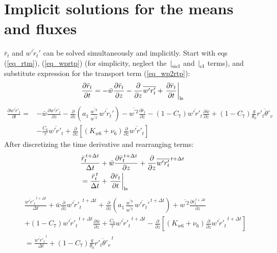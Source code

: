 \documentclass[11pt,fleqn]{article}
\newcommand{\ptlder}[2]{\frac{\partial #1}{\partial #2}}
\begin{document}
\section{Implicit solutions for the means and fluxes}

$\bar{r}_t$ and $\overline{w'r_t'}$ can be solved simultaneously and
implicitly.
Start with eqs (\ref{eq_rtm}), (\ref{eq_wprtp}) (for simplicity, neglect the 
$\left.\right|_{\rm{sicl}}$ and $\left.\right|_{\rm{cl}}$ terms), and substitute
expression for the transport term (\ref{eq_wp2rtp}):
%
\begin{equation}
\ptlder{\bar{r}_t}{t}
= - \bar{w}\ptlder{\bar{r}_t}{z} 
  - \ptlder{}{z}\overline{w'r'_t} 
  + \left. \ptlder{\bar{r}_t}{t} \right|_{\rm ls}
\end{equation}
%
\begin{equation}
\begin{split}
\ptlder{\overline{w'r'_t}}{t} 
= & - \bar{w}\ptlder{\overline{w'r'_t}}{z}	 		
    - \ptlder{}{z}
      \left(   
               a_1 \,
               \frac{\overline{w^{'3}}}{\overline{w^{'2}}} \,
               \overline{w'r_t'}
      \right)
    - \overline{w^{'2}}\ptlder{\bar{r}_t}{z} 
    - (1-C_7) \overline{w'r'_t}\ptlder{\bar{w}}{z}
    + (1-C_7) \frac{g}{\theta_0} \overline{r'_t\theta'_v} \\
  & - \frac{C_6}{\tau}\overline{w'r'_t}
    + \ptlder{}{z} \left[ \left( K_{w6} + \nu_6 \right)
                          \ptlder{}{z} \overline{w'r'_t}
                   \right]
\end{split}
\end{equation}
%
After discretizing the time derivative and rearranging terms:
%
\begin{equation}
\label{eq_rxm2}
\begin{split}
& \frac{\bar{r}_t^{\, t+\Delta t}}{\Delta t}
  + \bar{w}\ptlder{\bar{r}_t^{\, t+\Delta t}}{z} 
  + \ptlder{}{z}\overline{w'r'_t}^{\, t+\Delta t} \\
& = \frac{\bar{r}_t^{\, t}}{\Delta t}
  + \left. \ptlder{\bar{r}_t}{t} \right|_{\rm ls}
\end{split}
\end{equation}
%
\begin{equation}
\label{eq_wprxp2}
\begin{split}
& \frac{\overline{w'r'_t}^{\, t+\Delta t}}{\Delta t} 
  + \bar{w}\ptlder{}{z}\overline{w'r'_t}^{\, t+\Delta t}
  + \ptlder{}{z}
    \left(   
             a_1 \,
             \frac{\overline{w^{'3}}}{\overline{w^{'2}}} \,
             \overline{w'r_t'}^{\, t+\Delta t}
    \right)
  + \overline{w^{'2}}\ptlder{\bar{r}_t^{\, t+\Delta t}}{z} \\
& + (1-C_7) \overline{w'r'_t}^{\, t+\Delta t}\ptlder{\bar{w}}{z}
  + \frac{C_6}{\tau}\overline{w'r'_t}^{\, t+\Delta t}
  - \ptlder{}{z} \left[ \left( K_{w6} + \nu_6 \right)
                        \ptlder{}{z} \overline{w'r'_t}^{\, t+\Delta t}
                 \right]  \\
& = \frac{\overline{w'r'_t}^{\, t}}{\Delta t} 
    + (1-C_7) \frac{g}{\theta_0} \overline{r'_t\theta'_v}^{\, t}
\end{split}
\end{equation}
\end{document}
